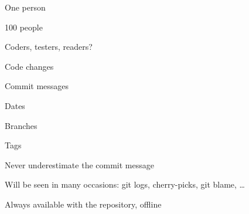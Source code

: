 

\begin{iframe}[A team]
\item One person
\item 100 people
\item Coders, testers, readers?
\end{iframe}

\begin{iframe}
\item Code changes
\item Commit messages
\item Dates
\item Branches
\item Tags
\end{iframe}




\begin{iframe}
\item Never underestimate the commit message
\item Will be seen in many occasions: git logs, cherry-picks, git blame, \dots
\item Always available with the repository, offline
\end{iframe}

